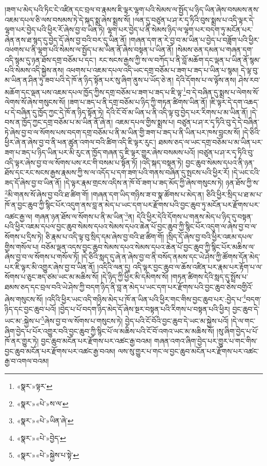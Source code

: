།ཟག་པ་མེད་པའི་ཏིང་ངེ་འཛིན་དང་བྲལ་བ་རྣམས་ཇི་ལྟར་ལྷག་པའི་སེམས་ལ་སྤྱོད་པ་ཉིད་ཡིན་ཞེས་བསམས་ནས་འཇམ་དཔལ་ཅི་ལས་བསམས་ཏེ་དེ་སྐད་སྨྲ་ཞེས་སྨྲས་སོ། །ལན་དུ་བཙུན་པ་ཤ་ར་དྭ་ཏིའི་བུས་སྨྲས་པ་འདི་ལྟར་དེ་ལྷག་པར་བྱེད་པའི་ཕྱིར་རོ་ཞེས་བྱ་བ་ཡིན་ཏེ། ལྷག་པར་བྱེད་པ་ནི་སེམས་ཉིད་ལ་ལྷག་པར་བདག་ཏུ་མངོན་པར་ཞེན་ནས་ཐ་སྙད་དུ་བྱེད་དོ་ཞེས་བྱ་བའི་བར་དུ་ཡིན་ནོ། །གཞན་དག་ན་རེ་བྱ་བ་མ་ཡིན་པ་བྱེད་པ་བཟློག་པའི་ཕྱིར་འཕགས་པ་ནི་ལྷག་པའི་སེམས་ལ་སྤྱོད་པ་མ་ཡིན་ནོ་ཞེས་བསྟན་པ་ཡིན་ནོ། །སེམས་ཅན་དམན་པ་གཞན་དག་འདི་སྙམ་དུ་ཉན་ཐོས་དགྲ་བཅོམ་པ་དང་། རང་སངས་རྒྱས་ཀྱི་ས་ལ་བཀོད་པ་ནི་བློ་མཆོག་དང་ལྡན་པ་ཡིན་ནོ་སྙམ་པའི་སེམས་འདི་སྐྱེས་ནས། འཕགས་པ་འཇམ་དཔལ་འདི་ཡང་དགྲ་བཅོམ་པ་ཟག་པ་ཟད་པ་ཡིན་པ་སྙམ། དེ་ལྟ་བུ་མ་ཡིན་ན་ཤིན་ཏུ་ཟབ་པའི་དེ་ཁོ་ན་ཉིད་སྟོན་པར་སུ་ཞིག་ནུས་པ་ཡོད་ཅེ་ན། དེའི་དོགས་པ་ལ་ལྟོས་ནས། ཤེས་རབ་མཆོག་དང་ལྡན་པས་འཇམ་དཔལ་ཁྱོད་ཀྱིས་དགྲ་བཅོམ་པ་ཟག་པ་ཟད་པ་ཇི་ལྟ་\footnote{«སྣར་»ལྟར་}བ་དེ་བཞིན་དུ་སྨྲས་པ་ལེགས་སོ་ལེགས་སོ་ཞེས་གསུངས་སོ། །ཟག་པ་ཟད་པ་ནི་དགྲ་བཅོམ་པ་ཉིད་ཀྱི་གཏན་ཚིགས་ཡིན་ནོ། །ཇི་ལྟར་དེ་དག་འཆད་པ་དེ་བཞིན་དུ་ཁྱོད་ཀྱང་དེ་ཁོ་ན་ཉིད་སྟོན་ཏེ། དེའི་ངོ་བོ་མ་ཡིན་པ་ནི་འདི་ལྟ་བུ་བྱེད་པར་རིགས་པ་མ་ཡིན་ནོ། །དེ་བས་ན་ཁྱོད་ཀྱང་དགྲ་བཅོམ་པ་མ་ཡིན་ནོ་ཞེ་ན། འཇམ་དཔལ་གྱིས་སྨྲས་པ། བཙུན་པ་ཤ་ར་དྭ་ཏིའི་བུ་དེ་དེ་བཞིན་ཏེ་ཞེས་བྱ་བ་ལ་སོགས་པས་བདག་དགྲ་བཅོམ་པ་ནི་མ་ཡིན་གྱི་ཟག་པ་ཟད་པ་ནི་ཡིན་པར་ཁས་བླངས་སོ། །དེ་ཅིའི་ཕྱིར་ཞེ་ན་ཞེས་བྱ་བ་ནི་ཕན་ཚུན་འགལ་བའི་ཚིག་འདི་ཇི་ལྟར་རུང་། ཐམས་ཅད་ལ་ཡང་དགྲ་བཅོམ་པ་མ་ཡིན་པར་ཟག་པ་ཟད་པ་ཉིད་ཡིན་པར་མི་རུང་ན་ཁྱོད་གཞན་དུ་ཇི་ལྟར་གྱུར་ཞེས་བསམས་པའོ། །བཙུན་པ་ཤ་ར་དྭ་ཏིའི་བུ་འདི་ལྟར་ཞེས་བྱ་བ་ལ་སོགས་པས་རང་གི་བསམ་པ་སྟོན་ཏོ། །འདི་སྐད་བསྟན་ཏེ། བྱང་ཆུབ་སེམས་དཔའ་ནི་ཉན་ཐོས་དང་རང་སངས་རྒྱས་རྣམས་ཀྱི་ས་ལ་འདོད་པ་དག་ཟག་པའི་གནས་བཞིན་དུ་སྤངས་པའི་ཕྱིར་རོ། །དེ་ཡང་ངའི་ཟད་དོ་ཞེས་བྱ་བ་ཡིན་ནོ། །དེ་ལྟར་རྣམ་གྲངས་འདིས་ན་ཁོ་བོ་ཟག་པ་ཟད་མོད་ཀྱི་ཞེས་གསུངས་ཏེ། ཉན་ཐོས་ཀྱི་ས་\footnote{«སྣར་»«པེ་»ས་ལ་}མི་གནས་སོ་ཞེས་བྱ་བའི་ཐ་ཚིག་གོ། །གཞན་དག་ཡིད་གཉིས་ཟ་བ་སྣ་ཚོགས་པ་མེད་ན། ཅིའི་ཕྱིར་སྲིད་པ་ཐ་མ་པ་ཁོ་ན་བྱང་ཆུབ་ཀྱི་སྙིང་པོར་འདུག་ནས་བླ་ན་མེད་པ་ཡང་དག་པར་རྫོགས་པའི་བྱང་ཆུབ་ཏུ་མངོན་པར་རྫོགས་པར་འཚང་རྒྱ་ལ། གཞན་ཉན་ཐོས་ལ་སོགས་པ་ནི་མ་ཡིན་\footnote{«སྣར་»«པེ་»ཡིན་ཞེ་}ན། དེའི་ཕྱིར་དེའི་དོགས་པ་གནས་མེད་པ་ཉིད་དུ་བསྟན་པའི་ཕྱིར་འཇམ་དཔལ་བྱང་ཆུབ་སེམས་དཔའ་སེམས་དཔའ་ཆེན་པོ་བྱང་ཆུབ་ཀྱི་སྙིང་པོར་འདུག་ལ་ཞེས་བྱ་བ་ལ་སོགས་པ་དྲིས་ཏེ། ཅི་རྣམ་པ་འདི་ལྟ་བུ་སྲིད་དམ་ཞེས་བྱ་བའི་ཐ་ཚིག་གོ། །སྲིད་དོ་ཞེས་བྱ་བའི་ཕྱིར་འཇམ་དཔལ་གྱིས་གསོལ་པ། བཅོམ་ལྡན་འདས་བྱང་ཆུབ་སེམས་དཔའ་སེམས་དཔའ་ཆེན་པོ་བྱང་ཆུབ་ཀྱི་སྙིང་པོར་མཆིས་ལ་ཞེས་བྱ་བ་ལ་སོགས་པ་གསོལ་ཏོ། །དེ་ཅིའི་སླད་དུ་ཞེ་ན་ཞེས་བྱ་བ་ནི་བསོད་ནམས་དང་ཡེ་ཤེས་ཀྱི་ཚོགས་དོན་མེད་པར་ཇི་ལྟར་མི་འགྱུར་ཞེས་བྱ་བ་ཡིན་ནོ། །འདིའི་ལན་དུ། འདི་ལྟར་བྱང་ཆུབ་ལ་ཆོས་འཛིན་པར་རྣམ་པར་རྟོག་པ་ལ་སོགས་པ་ཅུང་ཟད་ཙམ་ཡང་མ་མཆིས་སོ། །དེ་ཉིད་ཀྱི་ཕྱིར་མི་དམིགས་སོ། །གཏན་ཚིགས་དེའི་སླད་དུ་སྤྲོས་པ་ཐམས་ཅད་དང་བྲལ་བའི་ཡེ་ཤེས་ཀྱི་བདག་ཉིད་ནི་བླ་ན་མེད་པ་ཡང་དག་པར་རྫོགས་པའི་བྱང་ཆུབ་ཅེས་བགྱིའོ་ཞེས་གསུངས་སོ། །འདིའི་ཕྱིར་ཡང་འདི་གཉིས་མེད་པ་ཁོ་ན་ཡིན་པའི་ཕྱིར་གང་གིས་བྱང་ཆུབ་པར་:བྱེད་པ་\footnote{«སྣར་»«པེ་»བྱེད་}བདག་ཉིད་དང་བྱང་ཆུབ་པའོ། །བྱེད་པ་པོ་བདག་ཉིད་མེད་དོ་ཞེས་སྔར་བསྟན་པའི་རིགས་པ་བསྟན་པའི་ཕྱིར། བྱང་ཆུབ་དེ་ཡང་མ་:སྐྱེས་པ་\footnote{«སྣར་»«པེ་»སྐྱེས་པ་སྟེ་}ཞེས་བྱ་བ་ལ་སོགས་པ་གསུངས་ཏེ། བྱེད་པའི་ངོ་བོའི་བྱང་ཆུབ་དེ་ཡང་མ་སྐྱེས་པའོ། །དེ་ལ་གང་ཞིག་བྱེད་པ་པོར་འགྱུར་བའི་བྱང་ཆུབ་ཀྱི་སྙིང་པོ་ལ་མཆིས་པའི་ངོ་བོ་འགའ་ཡང་མ་མཆིས་སོ། །སུ་ཞིག་བྱེད་པ་པོ་ཁོ་ནར་གྱུར་ཏེ། བྱང་ཆུབ་མངོན་པར་རྫོགས་པར་འཚང་རྒྱ་བའམ། གཞན་འགའ་ཞིག་བྱེད་པར་གྱུར་པ་གང་གིས་བྱང་ཆུབ་མངོན་པར་རྫོགས་པར་འཚང་རྒྱ་བའམ། ལས་སུ་གྱུར་པ་གང་ལ་བྱང་ཆུབ་མངོན་པར་རྫོགས་པར་འཚང་རྒྱ་བ་འགལ་བའམ། 